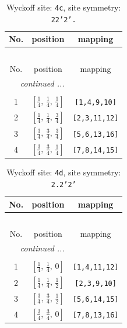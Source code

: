\documentclass[fleqn,8pt]{jsarticle}
\begin{document}
\renewcommand{\arraystretch}{1.2}
\begin{longtable}{ccc}
\caption{Wyckoff site: {\tt 4c}, site symmetry: {\tt 22'2'.}}
 \\
 \hline \hline
No. & position & mapping \\ \hline \endfirsthead

\multicolumn{2}{l}{\tablename\ \thetable{}} \\
 \hline \hline
No. & position & mapping \\ \hline \endhead

 \hline \hline
\multicolumn{2}{r}{\footnotesize\it continued ...} \\ \endfoot

 \hline \hline
\multicolumn{2}{r}{} \\ \endlastfoot

1 & $\left[ \frac{1}{4},\, \frac{1}{4},\, \frac{1}{4} \right]$ & {\tt [1,4,9,10]} \\ \hline
2 & $\left[ \frac{1}{4},\, \frac{1}{4},\, \frac{3}{4} \right]$ & {\tt [2,3,11,12]} \\ \hline
3 & $\left[ \frac{3}{4},\, \frac{3}{4},\, \frac{3}{4} \right]$ & {\tt [5,6,13,16]} \\ \hline
4 & $\left[ \frac{3}{4},\, \frac{3}{4},\, \frac{1}{4} \right]$ & {\tt [7,8,14,15]} \\
\end{longtable}
\renewcommand{\arraystretch}{1.2}
\begin{longtable}{ccc}
\caption{Wyckoff site: {\tt 4d}, site symmetry: {\tt 2.2'2'}}
 \\
 \hline \hline
No. & position & mapping \\ \hline \endfirsthead

\multicolumn{2}{l}{\tablename\ \thetable{}} \\
 \hline \hline
No. & position & mapping \\ \hline \endhead

 \hline \hline
\multicolumn{2}{r}{\footnotesize\it continued ...} \\ \endfoot

 \hline \hline
\multicolumn{2}{r}{} \\ \endlastfoot

1 & $\left[ \frac{1}{4},\, \frac{1}{4},\, 0 \right]$ & {\tt [1,4,11,12]} \\ \hline
2 & $\left[ \frac{1}{4},\, \frac{1}{4},\, \frac{1}{2} \right]$ & {\tt [2,3,9,10]} \\ \hline
3 & $\left[ \frac{3}{4},\, \frac{3}{4},\, \frac{1}{2} \right]$ & {\tt [5,6,14,15]} \\ \hline
4 & $\left[ \frac{3}{4},\, \frac{3}{4},\, 0 \right]$ & {\tt [7,8,13,16]} \\
\end{longtable}
\end{document}
